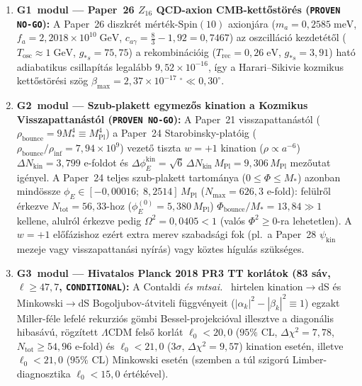 \documentclass[11pt,a4paper]{article}
\begin{document}
\begin{enumerate}\setlength{\itemsep}{2pt}
\item \textbf{G1~modul --- Paper~26 $Z_{16}$ QCD-axion CMB-kettőstörés (\texttt{PROVEN NO-GO}):} A Paper~26 diszkrét mérték-$\mathrm{Spin}(10)$ axionjára ($m_a = 0{,}2585\;\mathrm{meV}$, $f_a = 2{,}2018\times 10^{10}\;\mathrm{GeV}$, $c_{a\gamma} = \frac{8}{3} - 1{,}92 = 0{,}7467$) az oszcilláció kezdetétől ($T_{\mathrm{osc}}\approx 1\;\mathrm{GeV}$, $g_{*s}=75{,}75$) a rekombinációig ($T_{\mathrm{rec}}=0{,}26\;\mathrm{eV}$, $g_{*s}=3{,}91$) ható adiabatikus csillapítás legalább $9{,}52\times 10^{-16}$, így a Harari--Sikivie kozmikus kettőstörési szög \cite{HarariSikivie1992} $\beta_{\max} = 2{,}37\times 10^{-17}\;^\circ \ll 0{,}30^\circ$.
\item \textbf{G2~modul --- Szub-plakett egymezős kination a Kozmikus Visszapattanástól (\texttt{PROVEN NO-GO}):} A Paper~21 visszapattanástól ($\rho_{\mathrm{bounce}} = 9M_*^4 \equiv M_{\mathrm{Pl}}^4$) a Paper~24 Starobinsky-platóig ($\rho_{\mathrm{bounce}}/\rho_{\mathrm{inf}} = 7{,}94\times 10^9$) vezető tiszta $w=+1$ kination ($\rho\propto a^{-6}$) $\Delta N_{\mathrm{kin}} = 3{,}799$ e-foldot és $\Delta\phi_E^{\mathrm{kin}} = \sqrt{6}\,\Delta N_{\mathrm{kin}}\,M_{\mathrm{Pl}} = 9{,}306\,M_{\mathrm{Pl}}$ mezőutat igényel. A Paper~24 teljes szub-plakett tartománya ($0\le\Phi\le M_*$) azonban mindössze $\phi_E\in[-0{,}00016;\; 8{,}2514]\,M_{\mathrm{Pl}}$ ($N_{\max}=626{,}3$ e-fold): felülről érkezve $N_{\mathrm{tot}}=56{,}33$-hoz ($\phi_E^{(0)}=5{,}380\,M_{\mathrm{Pl}}$) $\Phi_{\mathrm{bounce}}/M_* = 13{,}84 \gg 1$ kellene, alulról érkezve pedig $\Omega^2 = 0{,}0405 < 1$ (valós $\Phi^2\ge 0$-ra lehetetlen). A $w=+1$ előfázishoz ezért extra merev szabadsági fok (pl.\ a Paper~28 $\psi_{\mathrm{kin}}$ mezeje vagy visszapattanási nyírás) vagy köztes hígulás szükséges.
\item \textbf{G3~modul --- Hivatalos Planck 2018 PR3 TT korlátok (83 sáv, $\ell\ge 47{,}7$, \texttt{CONDITIONAL}):} A Contaldi \textit{és mtsai.}\ \cite{Contaldi2003} hirtelen kination$\to$dS és Minkowski$\to$dS Bogoljubov-átviteli függvényeit ($|\alpha_k|^2 - |\beta_k|^2 \equiv 1$) egzakt Miller-féle lefelé rekurziós gömbi Bessel-projekcióval illesztve a diagonális hibasávú, rögzített $\Lambda$CDM felső korlát $\ell_0 < 20{,}0$ ($95\%$ CL, $\Delta\chi^2 = 7{,}78$, $N_{\mathrm{tot}} \ge 54{,}96$ e-fold) és $\ell_0 < 21{,}0$ ($3\sigma$, $\Delta\chi^2 = 9{,}57$) kination esetén, illetve $\ell_0 < 21{,}0$ ($95\%$ CL) Minkowski esetén (szemben a túl szigorú Limber-diagnosztika $\ell_0 < 15{,}0$ értékével).

\end{enumerate}
\end{document}
